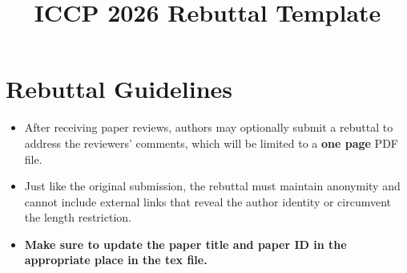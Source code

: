 \documentclass[10pt, journal, compsoc]{IEEEtran}
\title{ICCP 2026 Rebuttal Template}
\author{}
\newif\ifpeerreview
\newcommand{\paperID}{XXXX}
\begin{document}
\ifpeerreview
\linenumbers \linenumbersep 15pt\relax
\author{Paper ID \paperID \vspace{-2em}}
\fi

\maketitle


\section{Rebuttal Guidelines}
\begin{itemize}
    \item After receiving paper reviews, authors may optionally submit a rebuttal to address the reviewers' comments, which will be limited to a {\bf one page} PDF file.
    \item Just like the original submission, the rebuttal must maintain anonymity and cannot include external links that reveal the author identity or circumvent the length restriction.
    \item \bf Make sure to update the paper title and paper ID in the appropriate place in the tex file.
\end{itemize}

{\small
 
 
 }
\end{document}
